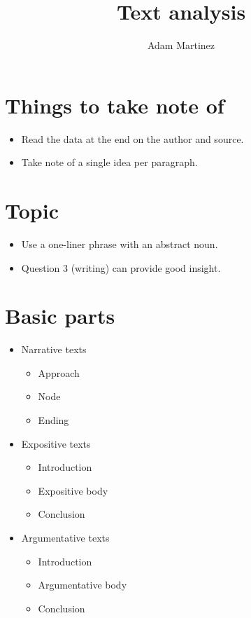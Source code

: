 \documentclass{article}
\title{Text analysis}
\author{Adam Martinez}
\date{}
\begin{document}
\maketitle

\section*{Things to take note of}

\begin{itemize}
    \item Read the data at the end on the author and source.
    \item Take note of a single idea per paragraph.
\end{itemize}

\section*{Topic}

\begin{itemize}
    \item Use a one-liner phrase with an abstract noun.
    \item Question 3 (writing) can provide good insight.
\end{itemize}

\section*{Basic parts}

\begin{itemize}
    \item Narrative texts
    \begin{itemize}
        \item Approach
        \item Node
        \item Ending
    \end{itemize}
    \item Expositive texts
    \begin{itemize}
        \item Introduction
        \item Expositive body
        \item Conclusion
    \end{itemize}
    \item Argumentative texts
    \begin{itemize}
        \item Introduction
        \item Argumentative body
        \item Conclusion
    \end{itemize}
\end{itemize}
\end{document}

